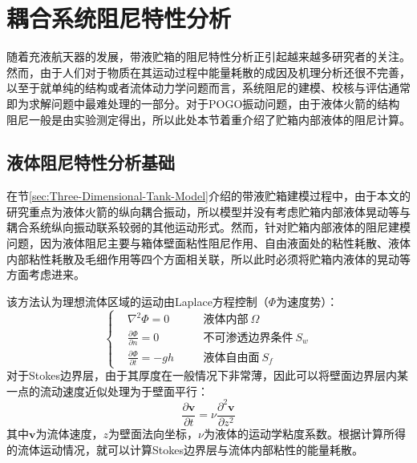 \section{耦合系统阻尼特性分析}
随着充液航天器的发展，带液贮箱的阻尼特性分析正引起越来越多研究者的关注。然而，由于人们对于物质在其运动过程中能量耗散的成因及机理分析还很不完善，以至于就单纯的结构或者流体动力学问题而言，系统阻尼的建模、校核与评估通常即为求解问题中最难处理的一部分。对于POGO振动问题，由于液体火箭的结构阻尼一般是由实验测定得出，所以此处本节着重介绍了贮箱内部液体的阻尼计算。

\subsection{液体阻尼特性分析基础}
在节\ref{sec:Three-Dimensional-Tank-Model}介绍的带液贮箱建模过程中，由于本文的研究重点为液体火箭的纵向耦合振动，所以模型并没有考虑贮箱内部液体晃动等与耦合系统纵向振动联系较弱的其他运动形式。然而，针对贮箱内部液体的阻尼建模问题，因为液体阻尼主要与箱体壁面粘性阻尼作用、自由液面处的粘性耗散、液体内部粘性耗散及毛细作用等四个方面相关联\cite{Henderson:1994, Martel:1998}，所以此时必须将贮箱内液体的晃动等方面考虑进来。

该方法认为理想流体区域的运动由Laplace方程控制（$\Phi$为速度势）：
\begin{equation}
	\label{eq:Ideal-Liquid-Laplace}
	\left \{
	\begin{alignedat}{2}
	&\nabla^2\Phi=0 &\quad &\text{液体内部}\:\Omega\\
	&{\displaystyle \frac{\partial \Phi}{\partial n}}=0 &\quad &\text{不可渗透边界条件}\:S_w \\
	&{\displaystyle \frac{\partial \Phi}{\partial t}}=-gh  &\quad &\text{液体自由面}\:S_f
	\end{alignedat} \right.
\end{equation}
对于Stokes边界层，由于其厚度在一般情况下非常薄，因此可以将壁面边界层内某一点的流动速度近似处理为于壁面平行：
\begin{equation}
	\frac{\partial \boldsymbol{v}}{\partial t} = \nu\frac{\partial^2 \boldsymbol{v}}{\partial z^2}
\end{equation}
其中$\boldsymbol{v}$为流体速度，$z$为壁面法向坐标，$\nu$为液体的运动学粘度系数。根据计算所得的流体运动情况，就可以计算Stokes边界层与流体内部粘性的能量耗散。

